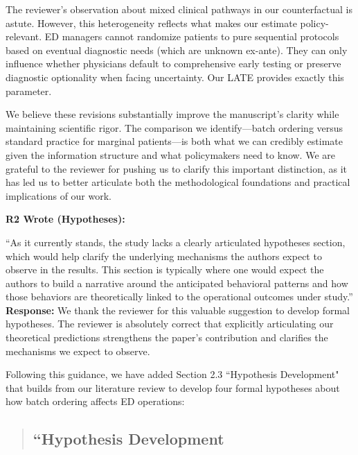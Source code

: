 \documentclass[11pt]{article}
\newenvironment{quote2}
{ \bigskip
\noindent
         \small\em
         \baselineskip=14pt
}
\newcommand{\1}{\hbox{\rm 1\kern-.35em 1}}
\begin{document}
{The reviewer's observation about mixed clinical pathways in our counterfactual is astute. However, this heterogeneity reflects what makes our estimate policy-relevant. ED managers cannot randomize patients to pure sequential protocols based on eventual diagnostic needs (which are unknown ex-ante). They can only influence whether physicians default to comprehensive early testing or preserve diagnostic optionality when facing uncertainty. Our LATE provides exactly this parameter.

We believe these revisions substantially improve the manuscript's clarity while maintaining scientific rigor. The comparison we identify—batch ordering versus standard practice for marginal patients—is both what we can credibly estimate given the information structure and what policymakers need to know. We are grateful to the reviewer for pushing us to clarify this important distinction, as it has led us to better articulate both the methodological foundations and practical implications of our work.

\color{black}

\begin{quote2}
\textbf{R2 Wrote (Hypotheses):}  

\noindent``As it currently stands, the study lacks a clearly articulated hypotheses section, which would help clarify the underlying mechanisms the authors expect to observe in the results. This section is typically where one would expect the authors to build a narrative around the anticipated behavioral patterns and how those behaviors are theoretically linked to the operational outcomes under study.” 
\end{quote2}

\noindent\textbf{Response:} \color{blue}We thank the reviewer for this valuable suggestion to develop formal hypotheses. The reviewer is absolutely correct that explicitly articulating our theoretical predictions strengthens the paper's contribution and clarifies the mechanisms we expect to observe.

Following this guidance, we have added Section 2.3 ``Hypothesis Development" that builds from our literature review to develop four formal hypotheses about how batch ordering affects ED operations:

\begin{quote}
\subsection*{``Hypothesis Development}


\end{quote}}
\end{document}
